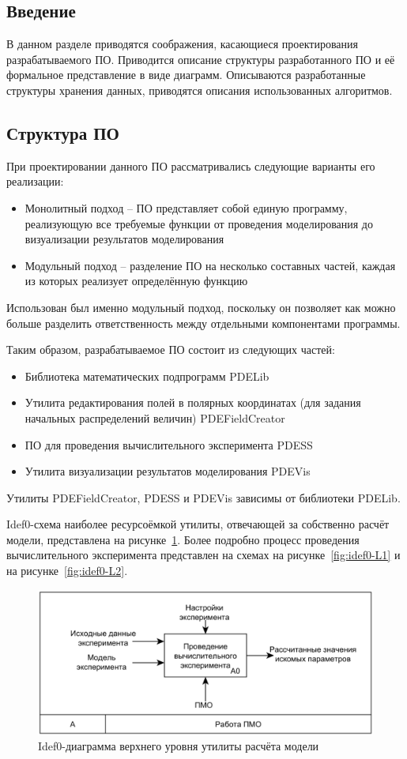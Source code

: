 \subsection{Введение}
В данном разделе приводятся соображения, касающиеся проектирования 
разрабатываемого ПО. Приводится описание структуры разработанного ПО и её 
формальное представление в виде диаграмм. Описываются разработанные структуры 
хранения данных, приводятся описания использованных алгоритмов.

\subsection{Структура ПО}
При проектировании данного ПО рассматривались следующие варианты его реализации:
\begin{itemize}
    \item Монолитный подход -- ПО представляет собой единую программу, 
    реализующую все требуемые функции от проведения моделирования до 
    визуализации результатов моделирования
    \item Модульный подход -- разделение ПО на несколько составных частей, 
    каждая из которых реализует определённую функцию
\end{itemize}
Использован был именно модульный подход, поскольку он позволяет как можно 
больше разделить ответственность между отдельными компонентами программы.

Таким образом, разрабатываемое ПО состоит из следующих частей:
\begin{itemize}
    \item Библиотека математических подпрограмм PDELib
    \item Утилита редактирования полей в полярных координатах (для задания 
    начальных распределений величин) PDEFieldCreator
    \item ПО для проведения вычислительного эксперимента PDESS
    \item Утилита визуализации результатов моделирования PDEVis
\end{itemize}

Утилиты PDEFieldCreator, PDESS и PDEVis зависимы от библиотеки PDELib.

Idef0-схема наиболее ресурсоёмкой утилиты, отвечающей за собственно расчёт 
модели, представлена на рисунке~\ref{fig:idef0-top}. Более подробно процесс 
проведения вычислительного эксперимента представлен на схемах на 
рисунке~\ref{fig:idef0-L1} и на рисунке~\ref{fig:idef0-L2}.

\begin{figure}
    \centering
    \includegraphics[width=.7\textwidth]{img/idef0/top}
    \caption{Idef0-диаграмма верхнего уровня утилиты расчёта модели}
    \label{fig:idef0-top}
\end{figure}

